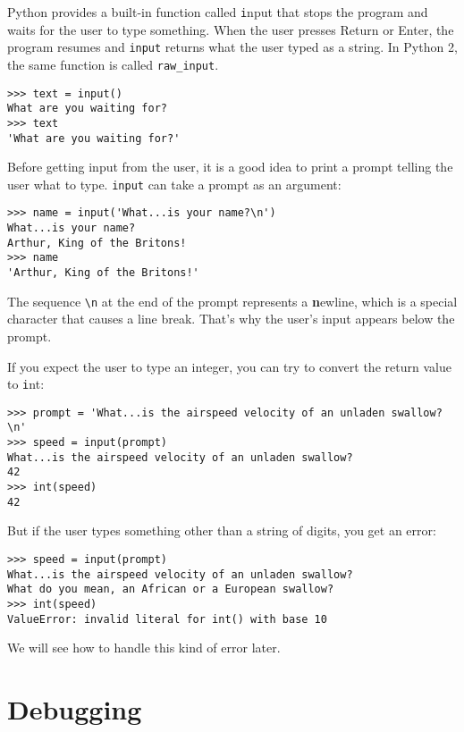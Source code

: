 \documentclass[
DIV=11,
fontsize=13,
twoside,
headinclude=false,
titlepage=firstiscover,
abstract=true,
headsepline=true,
footsepline=true,
chapterprefix=true, %
headings=big,
bibliography=totoc,%
captions=tableheading
]{scrbook}
\theoremstyle{definition}
\begin{document}
Python provides a built-in function called {\texttt input} that
stops the program and
waits for the user to type something.  When the user presses {\textsf
  Return} or {\textsf Enter}, the program resumes and \verb"input"
returns what the user typed as a string.  In Python 2, the same
function is called \verb"raw_input".

\begin{lstlisting}
>>> text = input()
What are you waiting for?
>>> text
'What are you waiting for?'
\end{lstlisting}
%
Before getting input from the user, it is a good idea to print a
prompt telling the user what to type.  \verb"input" can take a
prompt as an argument:

\begin{lstlisting}
>>> name = input('What...is your name?\n')
What...is your name?
Arthur, King of the Britons!
>>> name
'Arthur, King of the Britons!'
\end{lstlisting}
%
The sequence \verb"\n" at the end of the prompt represents a {\textbf
  newline}, which is a special character that causes a line break.
That's why the user's input appears below the prompt.  

If you expect the user to type an integer, you can try to convert
the return value to {\texttt int}:

\begin{lstlisting}
>>> prompt = 'What...is the airspeed velocity of an unladen swallow?\n'
>>> speed = input(prompt)
What...is the airspeed velocity of an unladen swallow?
42
>>> int(speed)
42
\end{lstlisting}
%
But if the user types something other than a string of digits,
you get an error:

\begin{lstlisting}
>>> speed = input(prompt)
What...is the airspeed velocity of an unladen swallow?
What do you mean, an African or a European swallow?
>>> int(speed)
ValueError: invalid literal for int() with base 10
\end{lstlisting}
%
We will see how to handle this kind of error later.


\section{Debugging}
\label{whitespace}
\end{document}
